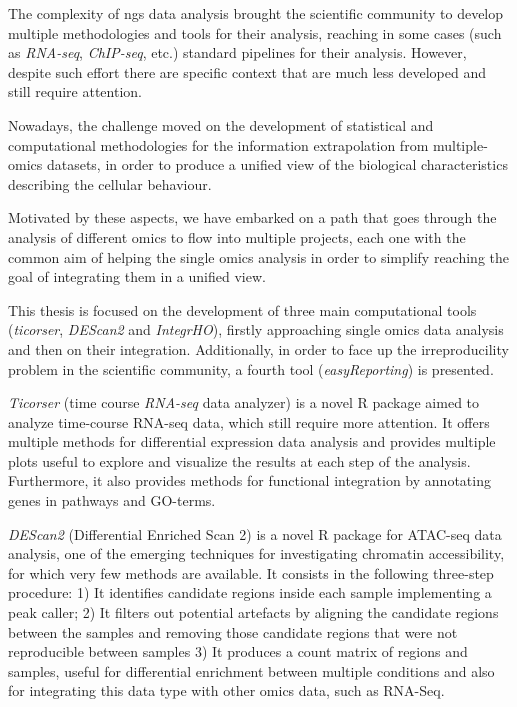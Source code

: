 The complexity of \gls{ngs} data analysis brought the scientific community to develop multiple methodologies and tools for their analysis, reaching in some cases (such as \textit{RNA-seq}, \textit{ChIP-seq}, etc.) standard pipelines for their analysis.
However, despite such effort there are specific context that are much less developed and still require attention.

Nowadays, the challenge moved on the development of statistical and computational methodologies for the information extrapolation from multiple-omics datasets, in order to produce a unified view of the biological characteristics describing the cellular behaviour.

Motivated by these aspects, we have embarked on a path that goes through the analysis of different omics to flow into multiple projects, each one with the common aim of helping the single omics analysis in order to simplify reaching the goal of integrating them in a unified view.

This thesis is focused on the development of three main computational tools (\textit{ticorser}, \textit{DEScan2} and \textit{IntegrHO}), firstly approaching single omics data analysis and then on their integration.
Additionally, in order to face up the irreproducility problem in the scientific community, a fourth tool (\textit{easyReporting}) is presented.

\textit{Ticorser} (time course \textit{RNA-seq} data analyzer) is a novel R package aimed to analyze time-course RNA-seq data, which still require more attention. It offers multiple methods for differential expression data analysis and provides multiple plots useful to explore and visualize the results at each step of the analysis. Furthermore, it also provides methods for functional integration by annotating genes in pathways and GO-terms.

\textit{DEScan2} (Differential Enriched Scan 2) is a novel R package for ATAC-seq data analysis, one of the emerging techniques for investigating chromatin accessibility, for which very few methods are available. It consists in the following three-step procedure: 1) It identifies candidate regions inside each sample implementing a peak caller; 2) It filters out potential artefacts by aligning the candidate regions between the samples and removing those candidate regions that were not reproducible between samples 3) It produces a count matrix of regions and samples, useful for differential enrichment between multiple conditions and also for integrating this data type with other omics data, such as RNA-Seq.

